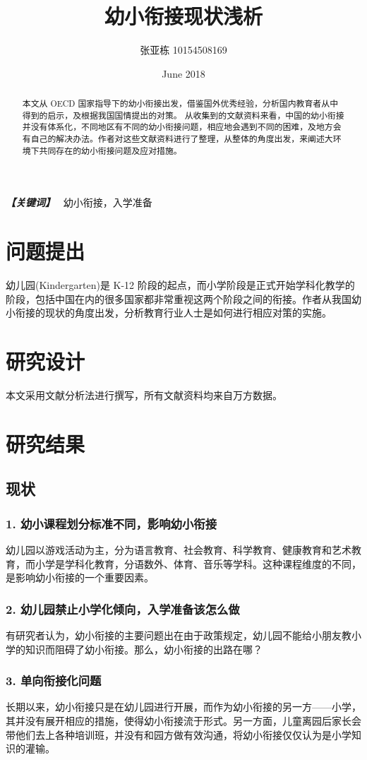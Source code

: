 \documentclass[a4paper,oneside]{article}
\title{幼小衔接现状浅析}
\author{张亚栋 10154508169}
\date{June 2018}
\providecommand{\keywords}[1]
{
  \small    
  \textbf{\textit{【关键词】}} #1
}
\begin{document}
\rmfamily{\mdseries}
\maketitle
\thispagestyle{empty}
\newpage
\thispagestyle{empty}
\tableofcontents
\newpage
\thispagestyle{empty}
\setcounter{page}{1} %
\begin{abstract}
    本文从 OECD 国家指导下的幼小衔接出发，借鉴国外优秀经验，分析国内教育者从中得到的启示，及根据我国国情提出的对策。
    从收集到的文献资料来看，中国的幼小衔接并没有体系化，不同地区有不同的幼小衔接问题，相应地会遇到不同的困难，及地方会有自己的解决办法。作者对这些文献资料进行了整理，从整体的角度出发，来阐述大环境下共同存在的幼小衔接问题及应对措施。
\end{abstract}
\keywords{~幼小衔接，入学准备}
\newpage
\section{问题提出}
    幼儿园(Kindergarten)是 K-12 阶段的起点，而小学阶段是正式开始学科化教学的阶段，包括中国在内的很多国家都非常重视这两个阶段之间的衔接。作者从我国幼小衔接的现状的角度出发，分析教育行业人士是如何进行相应对策的实施。
\section{研究设计}
    本文采用文献分析法进行撰写，所有文献资料均来自万方数据。
\section{研究结果}
    \subsection{现状}
        \subsubsection*{1. 幼小课程划分标准不同，影响幼小衔接}
            幼儿园以游戏活动为主，分为语言教育、社会教育、科学教育、健康教育和艺术教育，而小学是学科化教育，分语数外、体育、音乐等学科。这种课程维度的不同，是影响幼小衔接的一个重要因素。
        \subsubsection*{2. 幼儿园禁止小学化倾向，入学准备该怎么做}
            有研究者认为，幼小衔接的主要问题出在由于政策规定，幼儿园不能给小朋友教小学的知识而阻碍了幼小衔接。那么，幼小衔接的出路在哪？
        \subsubsection*{3. 单向衔接化问题}
            长期以来，幼小衔接只是在幼儿园进行开展，而作为幼小衔接的另一方——小学，其并没有展开相应的措施，使得幼小衔接流于形式。另一方面，儿童离园后家长会带他们去上各种培训班，并没有和园方做有效沟通，将幼小衔接仅仅认为是小学知识的灌输。
\end{document}
